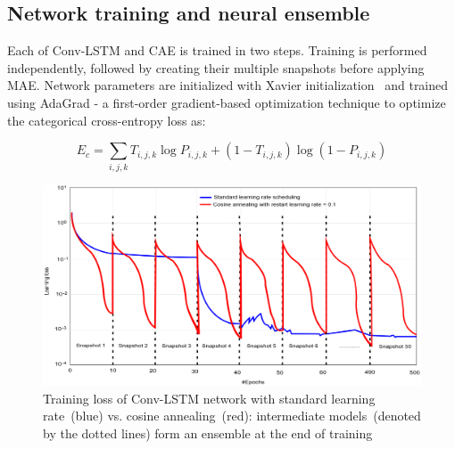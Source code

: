\subsection{Network training and neural ensemble} %
Each of Conv-LSTM and CAE is trained in two steps. Training is performed independently, followed by creating their multiple snapshots before applying MAE. Network parameters are initialized with Xavier initialization~\cite{xavier} and trained using AdaGrad - a first-order gradient-based optimization technique to optimize the categorical cross-entropy loss as: 

\vspace{-2mm}
\begin{equation} 
    E_{c} = \sum_{i, j, k} T_{i, j, k} \log P_{i, j, k}+\left(1-T_{i, j, k}\right) \log \left(1-P_{i, j, k}\right)
    \label{eq:cce3}
\end{equation} 

\begin{figure}
    \centering
    \includegraphics[scale=0.55]{images/cac.png}
    \caption[Cosine cyclic annealing-based training]{Training loss of Conv-LSTM network with standard learning rate~(blue) vs. cosine annealing~(red): intermediate models~(denoted by the dotted lines) form an ensemble at the end of training~\cite{karimACCA2019}}
    \label{fig:ca}
    \vspace{-2mm}
\end{figure}

